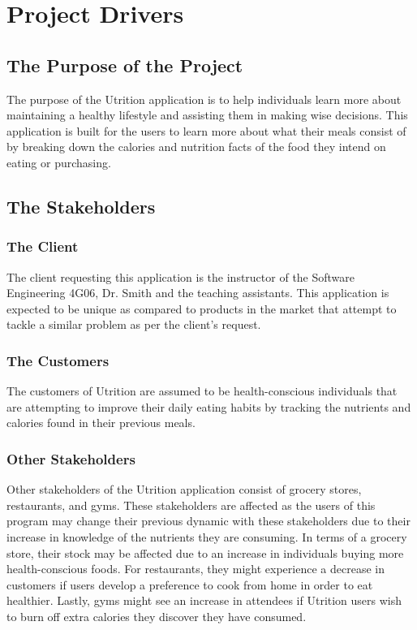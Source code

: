 \documentclass[12pt]{article}
\begin{document}

\section{Project Drivers }

\subsection{The Purpose of the Project}

The purpose of the Utrition application is to help individuals learn more about maintaining a healthy lifestyle and assisting them in making wise decisions. This application is built for the users to learn more about what their meals consist of by breaking down the calories and nutrition facts of the food they intend on eating or purchasing.  

\subsection{The Stakeholders }

\subsubsection{The Client}  

The client requesting this application is the instructor of the Software Engineering 4G06, Dr. Smith and the teaching assistants. This application is expected to be unique as compared to products in the market that attempt to tackle a similar problem as per the client's request.  

\subsubsection{The Customers} 

The customers of Utrition are assumed to be health-conscious individuals that are attempting to improve their daily eating habits by tracking the nutrients and calories found in their previous meals. 

\subsubsection{Other Stakeholders}
Other stakeholders of the Utrition application consist of grocery stores, restaurants, and gyms. These stakeholders are affected as the users of this program may change their previous dynamic with these stakeholders due to their increase in knowledge of the nutrients they are consuming. In terms of a grocery store, their stock may be affected due to an increase in individuals buying more health-conscious foods. For restaurants, they might experience a decrease in customers if users develop a preference to cook from home in order to eat healthier. Lastly, gyms might see an increase in attendees if Utrition users wish to burn off extra calories they discover they have consumed.
\end{document}
